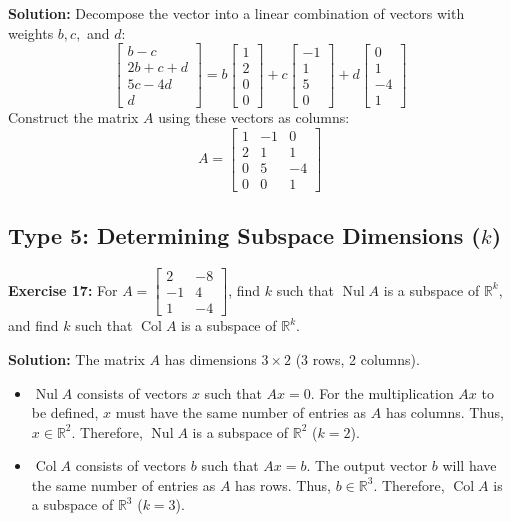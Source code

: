 \documentclass[11pt]{article}
\begin{document}
\textbf{Solution:}
Decompose the vector into a linear combination of vectors with weights $b, c,$ and $d$:
\[
\begin{bmatrix} b-c \\ 2b+c+d \\ 5c-4d \\ d \end{bmatrix} = b \begin{bmatrix} 1 \\ 2 \\ 0 \\ 0 \end{bmatrix} + c \begin{bmatrix} -1 \\ 1 \\ 5 \\ 0 \end{bmatrix} + d \begin{bmatrix} 0 \\ 1 \\ -4 \\ 1 \end{bmatrix}
\]
Construct the matrix $A$ using these vectors as columns:
\[
A = \begin{bmatrix} 1 & -1 & 0 \\ 2 & 1 & 1 \\ 0 & 5 & -4 \\ 0 & 0 & 1 \end{bmatrix}
\]

\subsection{Type 5: Determining Subspace Dimensions ($k$)}

\textbf{Exercise 17:} For $A = \begin{bmatrix} 2 & -8 \\ -1 & 4 \\ 1 & -4 \end{bmatrix}$, find $k$ such that $\operatorname{Nul} A$ is a subspace of $\mathbb{R}^k$, and find $k$ such that $\operatorname{Col} A$ is a subspace of $\mathbb{R}^k$.

\textbf{Solution:}
The matrix $A$ has dimensions $3 \times 2$ (3 rows, 2 columns).
\begin{itemize}
    \item $\operatorname{Nul} A$ consists of vectors $x$ such that $Ax = 0$. For the multiplication $Ax$ to be defined, $x$ must have the same number of entries as $A$ has columns. Thus, $x \in \mathbb{R}^2$. Therefore, $\operatorname{Nul} A$ is a subspace of $\mathbb{R}^2$ ($k=2$).
    \item $\operatorname{Col} A$ consists of vectors $b$ such that $Ax = b$. The output vector $b$ will have the same number of entries as $A$ has rows. Thus, $b \in \mathbb{R}^3$. Therefore, $\operatorname{Col} A$ is a subspace of $\mathbb{R}^3$ ($k=3$).
\end{itemize}
\end{document}
